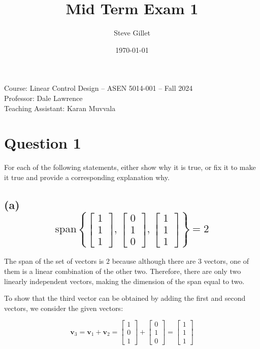 \documentclass{article}
\title{Mid Term Exam 1}
\author{Steve Gillet}
\date{\today}
\newcommand{\className}{Course: Linear Control Design – ASEN 5014-001 – Fall 2024}
\newcommand{\professorName}{Professor: Dale Lawrence}
\newcommand{\taName}{Teaching Assistant: Karan Muvvala}
\begin{document}
\maketitle
\begin{center}
    \large{\className} \\
    \large{\professorName} \\
    \large{\taName}
\end{center}

\section*{Question 1}

For each of the following statements, either show why it is true, or fix it to make it true and provide a corresponding explanation why.

\subsection*{(a) \[\text{span}\left\{ \begin{bmatrix} 1 \\ 1 \\ 1 \end{bmatrix}, \begin{bmatrix} 0 \\ 1 \\ 0 \end{bmatrix}, \begin{bmatrix} 1 \\ 1 \\ 1 \end{bmatrix} \right\} = 2 \]}

The span of the set of vectors is $2$ because although there are $3$ vectors, one of them is a linear combination of the other two. Therefore, there are only two linearly independent vectors, making the dimension of the span equal to two.

To show that the third vector can be obtained by adding the first and second vectors, we consider the given vectors:

\[\mathbf{v}_3 = \mathbf{v}_1 + \mathbf{v}_2 = \begin{bmatrix} 1 \\ 0 \\ 1 \end{bmatrix} + \begin{bmatrix} 0 \\ 1 \\ 0 \end{bmatrix} = \begin{bmatrix} 1 \\ 1 \\ 1 \end{bmatrix}\]
\end{document}
